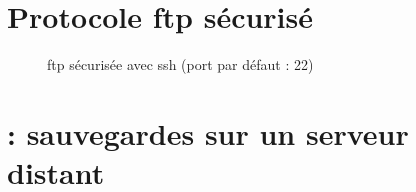 \documentclass[letterpaper,10pt,french]{sphinxmanual}
\begin{document}
\section{Protocole ftp sécurisé}
\label{\detokenize{17-transferer-fichiers:protocole-ftp-securise}}\begin{description}
\item[{}] \leavevmode
ftp sécurisée avec ssh (port par défaut : 22)

\end{description}


\section{ : sauvegardes sur un serveur distant}
\end{document}
